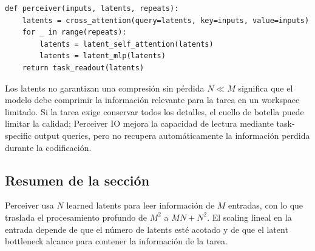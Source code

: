 
\begin{lstlisting}[caption={Pseudocódigo conceptual de encode/process/readout en Perceiver.}]
def perceiver(inputs, latents, repeats):
    latents = cross_attention(query=latents, key=inputs, value=inputs)
    for _ in range(repeats):
        latents = latent_self_attention(latents)
        latents = latent_mlp(latents)
    return task_readout(latents)
\end{lstlisting}


\begin{warningbox}{Los latents no garantizan una compresión sin pérdida}
$N\ll M$ significa que el modelo debe comprimir la información relevante para la tarea en un workspace limitado. Si la tarea exige conservar todos los detalles, el cuello de botella puede limitar la calidad; Perceiver IO mejora la capacidad de lectura mediante task-specific output queries, pero no recupera automáticamente la información perdida durante la codificación.
\end{warningbox}

\subsection{Resumen de la sección}

Perceiver usa $N$ learned latents para leer información de $M$ entradas, con lo que traslada el procesamiento profundo de $M^2$ a $MN+N^2$. El scaling lineal en la entrada depende de que el número de latents esté acotado y de que el latent bottleneck alcance para contener la información de la tarea.
